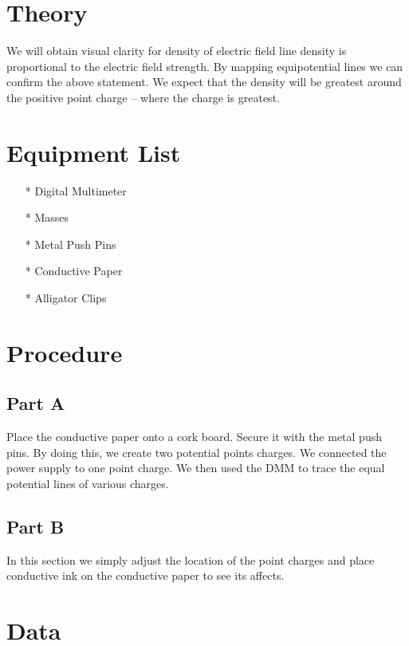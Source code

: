 \documentclass[twocolumn]{article}
\begin{document}
\section{Theory} %
\label{sec:theory}
We will obtain visual clarity for density of electric field line density is proportional to the electric field strength.  By mapping equipotential lines we can confirm the above statement.  We expect that the density will be greatest around the positive point charge -- where the charge is greatest.



\section{Equipment List} %
\label{sec:equipment_list}
\begin{itemize}
\item[*] Digital Multimeter
\item[*] Masses
\item[*] Metal Push Pins
\item[*] Conductive Paper
\item[*] Alligator Clips
\end{itemize}



\section{Procedure}\label{sec:procedure}
	\subsection{Part A}\label{sub:part_a}

	Place the conductive paper onto a cork board.  Secure it with the metal push pins.  
	By doing this, we create two potential points charges.  We connected the power supply to 
	one point charge.  We then used the DMM to trace the equal potential lines of various 
	charges.

	\subsection{Part B} %
	\label{sub:part_b}

	In this section we simply adjust the location of the point charges and place conductive ink on the conductive paper to see its affects.


\section{Data} %
\label{sec:data}
\end{document}
